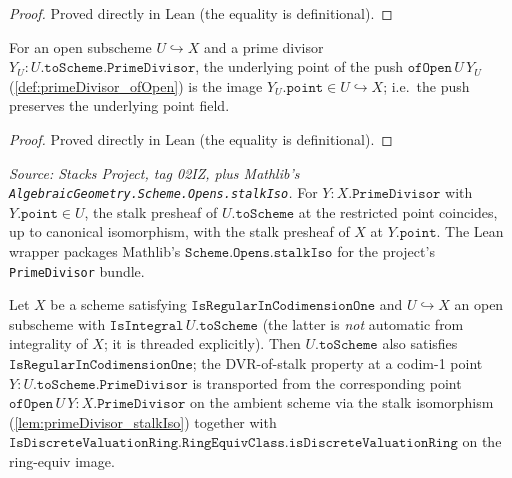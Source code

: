 \begin{proof}
  Proved directly in Lean (the equality is definitional).
\end{proof}
\begin{lemma}

  \label{lem:primeDivisor_ofOpen_point}
  For an open subscheme \(U \hookrightarrow X\) and a prime divisor
  \(Y_U : U.\texttt{toScheme}.\texttt{PrimeDivisor}\), the underlying point of
  the push \(\texttt{ofOpen}\,U\,Y_U\) (\ref{def:primeDivisor_ofOpen}) is the
  image \(Y_U.\texttt{point} \in U \hookrightarrow X\); i.e.\ the push
  preserves the underlying point field.
\end{lemma}
\begin{proof}
  Proved directly in Lean (the equality is definitional).
\end{proof}
\begin{lemma}

  \label{lem:primeDivisor_stalkIso}
  \textit{Source: Stacks Project, tag 02IZ, plus Mathlib's
  \texttt{AlgebraicGeometry.Scheme.Opens.stalkIso}.}
  For \(Y : X.\texttt{PrimeDivisor}\) with \(Y.\texttt{point} \in U\), the
  stalk presheaf of \(U.\texttt{toScheme}\) at the restricted point coincides,
  up to canonical isomorphism, with the stalk presheaf of \(X\) at
  \(Y.\texttt{point}\). The Lean wrapper packages Mathlib's
  \(\texttt{Scheme.Opens.stalkIso}\) for the project's
  \texttt{PrimeDivisor} bundle.
\end{lemma}
\begin{theorem}

  \label{thm:isRegularInCodimensionOne_open}
  Let \(X\) be a scheme satisfying \(\texttt{IsRegularInCodimensionOne}\)
  and \(U \hookrightarrow X\) an open subscheme with
  \(\texttt{IsIntegral}\,U.\texttt{toScheme}\) (the latter is \emph{not}
  automatic from integrality of \(X\); it is threaded explicitly).
  Then \(U.\texttt{toScheme}\) also satisfies
  \(\texttt{IsRegularInCodimensionOne}\); the DVR-of-stalk property at a
  codim-1 point \(Y : U.\texttt{toScheme}.\texttt{PrimeDivisor}\) is
  transported from the corresponding point
  \(\texttt{ofOpen}\,U\,Y : X.\texttt{PrimeDivisor}\) on the ambient
  scheme via the stalk isomorphism (\ref{lem:primeDivisor_stalkIso})
  together with
  \(\texttt{IsDiscreteValuationRing.RingEquivClass.isDiscreteValuationRing}\)
  on the ring-equiv image.
\end{theorem}
